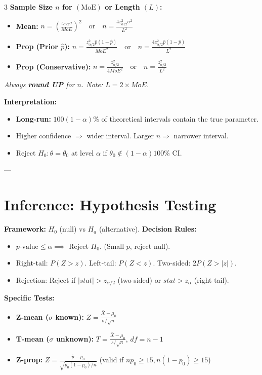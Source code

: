 \documentclass[10pt]{article}
\begin{document}
\begin{multicols}{3}
\textbf{Sample Size $n$ for $(\text{MoE})$ or Length $(L)$:}
\begin{itemize}
    \item \textbf{Mean:} $n = \left( \frac{z_{\alpha/2} \sigma}{MoE} \right)^2 \quad \text{or} \quad n = \frac{4z_{\alpha/2}^2 \sigma^2}{L^2}$
    \item \textbf{Prop (Prior $\hat{p}$):} $n = \frac{z_{\alpha/2}^2 \hat{p}(1-\hat{p})}{MoE^2} \quad \text{or} \quad n = \frac{4z_{\alpha/2}^2 \hat{p}(1-\hat{p})}{L^2}$
    \item \textbf{Prop (Conservative):} $n = \frac{z_{\alpha/2}^2}{4 MoE^2} \quad \text{or} \quad n = \frac{z_{\alpha/2}^2}{L^2}$
\end{itemize}
\textit{Always \textbf{round UP} for $n$. Note: $L = 2 \times MoE$.}

\textbf{Interpretation:}
\begin{itemize}
    \item \textbf{Long-run:} $100(1-\alpha)\%$ of theoretical intervals contain the true parameter.
    \item Higher confidence $\Rightarrow$ wider interval. Larger $n \Rightarrow$ narrower interval.
    \item Reject $H_0: \theta = \theta_0$ at level $\alpha$ if $\theta_0 \notin (1-\alpha)100\%$ CI.
\end{itemize}

---

\section*{Inference: Hypothesis Testing}
\textbf{Framework:} $H_0$ (null) vs $H_a$ (alternative).
\textbf{Decision Rules:}
\begin{itemize}
    \item $p\text{-value} \le \alpha \implies$ Reject $H_0$. (Small $p$, reject null).
    \item Right-tail: $P(Z > z)$. Left-tail: $P(Z < z)$. Two-sided: $2P(Z > |z|)$.
    \item Rejection: Reject if $|stat| > z_{\alpha/2}$ (two-sided) or $stat > z_\alpha$ (right-tail).
\end{itemize}

\textbf{Specific Tests:}
\begin{itemize}
    \item \textbf{Z-mean ($\sigma$ known):} $Z = \frac{\bar{X} - \mu_0}{\sigma/\sqrt{n}}$
    \item \textbf{T-mean ($\sigma$ unknown):} $T = \frac{\bar{X} - \mu_0}{s/\sqrt{n}}, \, df = n-1$
    \item \textbf{Z-prop:} $Z = \frac{\hat{p} - p_0}{\sqrt{p_0(1-p_0)/n}}$ (valid if $np_0 \ge 15, n(1-p_0) \ge 15$)
\end{itemize}


\end{multicols}
\end{document}
